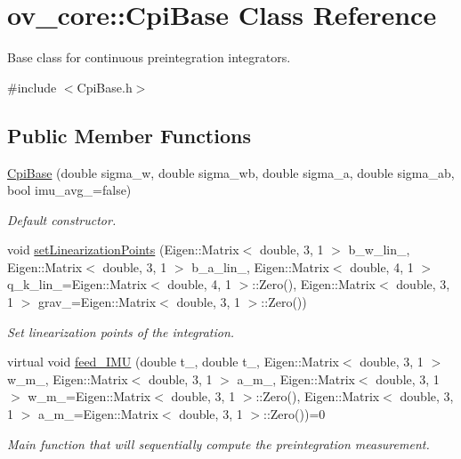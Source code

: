 \hypertarget{classov__core_1_1CpiBase}{}\section{ov\+\_\+core\+:\+:Cpi\+Base Class Reference}
\label{classov__core_1_1CpiBase}


Base class for continuous preintegration integrators.  




{\ttfamily \#include $<$Cpi\+Base.\+h$>$}

\subsection*{Public Member Functions}
\begin{DoxyCompactItemize}
\item 
\hyperlink{classov__core_1_1CpiBase_a362f384da35801365d15d53dfe7d3116}{Cpi\+Base} (double sigma\+\_\+w, double sigma\+\_\+wb, double sigma\+\_\+a, double sigma\+\_\+ab, bool imu\+\_\+avg\+\_\+=false)
\begin{DoxyCompactList}\small\item\em Default constructor. \end{DoxyCompactList}\item 
void \hyperlink{classov__core_1_1CpiBase_a32c11e3e61dc8a524bf48a18504b5417}{set\+Linearization\+Points} (Eigen\+::\+Matrix$<$ double, 3, 1 $>$ b\+\_\+w\+\_\+lin\+\_\+, Eigen\+::\+Matrix$<$ double, 3, 1 $>$ b\+\_\+a\+\_\+lin\+\_\+, Eigen\+::\+Matrix$<$ double, 4, 1 $>$ q\+\_\+k\+\_\+lin\+\_\+=Eigen\+::\+Matrix$<$ double, 4, 1 $>$\+::Zero(), Eigen\+::\+Matrix$<$ double, 3, 1 $>$ grav\+\_\+=Eigen\+::\+Matrix$<$ double, 3, 1 $>$\+::Zero())
\begin{DoxyCompactList}\small\item\em Set linearization points of the integration. \end{DoxyCompactList}\item 
virtual void \hyperlink{classov__core_1_1CpiBase_af3b192b968d702b484a672a5557bea13}{feed\+\_\+\+I\+MU} (double t\+\_, double t\+\_, Eigen\+::\+Matrix$<$ double, 3, 1 $>$ w\+\_\+m\+\_, Eigen\+::\+Matrix$<$ double, 3, 1 $>$ a\+\_\+m\+\_, Eigen\+::\+Matrix$<$ double, 3, 1 $>$ w\+\_\+m\+\_=Eigen\+::\+Matrix$<$ double, 3, 1 $>$\+::Zero(), Eigen\+::\+Matrix$<$ double, 3, 1 $>$ a\+\_\+m\+\_=Eigen\+::\+Matrix$<$ double, 3, 1 $>$\+::Zero())=0
\begin{DoxyCompactList}\small\item\em Main function that will sequentially compute the preintegration measurement. \end{DoxyCompactList}\end{DoxyCompactItemize}
